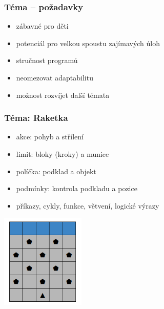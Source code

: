 \documentclass[xcolor=dvipsnames, 14pt]{beamer}
\begin{document}
\begin{frame}
\frametitle{Téma -- požadavky}
\begin{itemize}
\item zábavné pro děti
\item potenciál pro velkou spoustu zajímavých úloh
\item stručnost programů
\item neomezovat adaptabilitu
\item možnost rozvíjet další témata
\end{itemize}
\end{frame}

\begin{frame}
\frametitle{Téma: Raketka}
\begin{itemize}
\item akce: pohyb a střílení
\item limit: bloky (kroky) a munice
\item políčka: podklad a objekt
\item podmínky: kontrola podkladu a pozice
\item příkazy, cykly, funkce, větvení, logické výrazy
\end{itemize}
\centering\includegraphics[width=0.3\textwidth]{img/raketka.png}
\end{frame}
\end{document}
